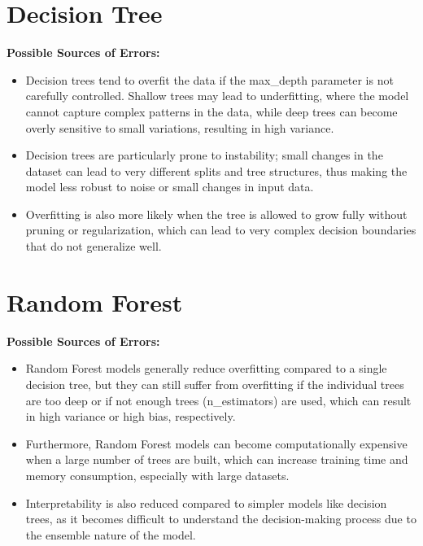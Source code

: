 \documentclass[12pt]{report}
\begin{document}
\section{Decision Tree}

\textbf{Possible Sources of Errors:} 
\begin{itemize}
    \item Decision trees tend to overfit the data if the max\_depth parameter is not carefully controlled. Shallow trees may lead to underfitting, where the model cannot capture complex patterns in the data, while deep trees can become overly sensitive to small variations, resulting in high variance.
    \item Decision trees are particularly prone to instability; small changes in the dataset can lead to very different splits and tree structures, thus making the model less robust to noise or small changes in input data.
    \item Overfitting is also more likely when the tree is allowed to grow fully without pruning or regularization, which can lead to very complex decision boundaries that do not generalize well.
\end{itemize}

\section{Random Forest}
\textbf{Possible Sources of Errors:} 
\begin{itemize}
    \item Random Forest models generally reduce overfitting compared to a single decision tree, but they can still suffer from overfitting if the individual trees are too deep or if not enough trees (n\_estimators) are used, which can result in high variance or high bias, respectively.
    \item Furthermore, Random Forest models can become computationally expensive when a large number of trees are built, which can increase training time and memory consumption, especially with large datasets.
    \item Interpretability is also reduced compared to simpler models like decision trees, as it becomes difficult to understand the decision-making process due to the ensemble nature of the model.
\end{itemize}
\end{document}
